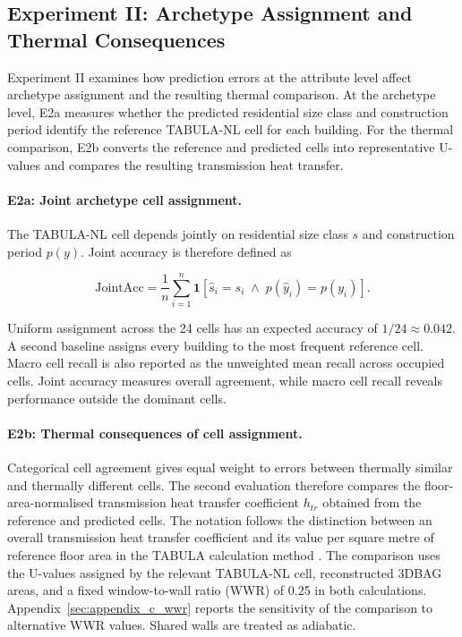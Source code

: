 \subsection{Experiment II: Archetype Assignment and Thermal Consequences}
\label{sec:weighted_archetype_metric}

Experiment II examines how prediction errors at the attribute level affect archetype assignment and the resulting thermal comparison. At the archetype level, E2a measures whether the predicted residential size class and construction period identify the reference TABULA-NL cell for each building. For the thermal comparison, E2b converts the reference and predicted cells into representative U-values and compares the resulting transmission heat transfer.

\paragraph{E2a: Joint archetype cell assignment.}
The TABULA-NL cell depends jointly on residential size class $s$ and construction period $p(y)$. Joint accuracy is therefore defined as

\begin{equation}
	\label{eq:joint_acc}
	\mathrm{JointAcc}
	= \frac{1}{n}\sum_{i=1}^{n}
	\mathbf{1}\!\left[\hat{s}_i = s_i \;\land\; p(\hat{y}_i) = p(y_i)\right].
\end{equation}

Uniform assignment across the 24 cells has an expected accuracy of $1/24 \approx 0.042$. A second baseline assigns every building to the most frequent reference cell. Macro cell recall is also reported as the unweighted mean recall across occupied cells. Joint accuracy measures overall agreement, while macro cell recall reveals performance outside the dominant cells.

\paragraph{E2b: Thermal consequences of cell assignment.}
Categorical cell agreement gives equal weight to errors between thermally similar and thermally different cells. The second evaluation therefore compares the floor-area-normalised transmission heat transfer coefficient $h_{tr}$ obtained from the reference and predicted cells. The notation follows the distinction between an overall transmission heat transfer coefficient and its value per square metre of reference floor area in the \acs{TABULA} calculation method \parencite{loga2013calculation}. The comparison uses the U-values assigned by the relevant TABULA-NL cell, reconstructed 3DBAG areas, and a fixed window-to-wall ratio (WWR) of 0.25 in both calculations. Appendix~\ref{sec:appendix_c_wwr} reports the sensitivity of the comparison to alternative WWR values. Shared walls are treated as adiabatic.

